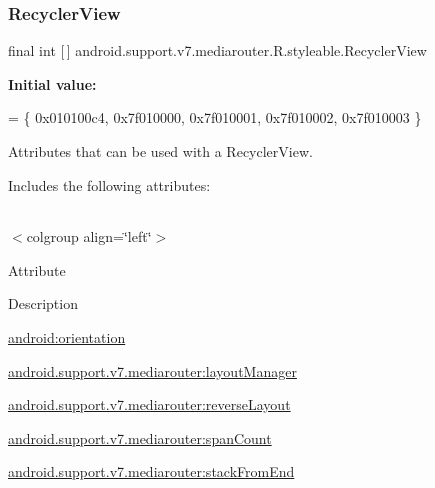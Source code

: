 \subsubsection{\texorpdfstring{Recycler\+View}{RecyclerView}}
{\footnotesize\ttfamily final int \mbox{[}$\,$\mbox{]} android.\+support.\+v7.\+mediarouter.\+R.\+styleable.\+Recycler\+View\hspace{0.3cm}{\ttfamily [static]}}

{\bfseries Initial value\+:}
\begin{DoxyCode}
= \{
            0x010100c4, 0x7f010000, 0x7f010001, 0x7f010002,
            0x7f010003
        \}
\end{DoxyCode}
Attributes that can be used with a Recycler\+View. 

Includes the following attributes\+:

\tabulinesep=1mm
\begin{longtabu} spread 0pt [c]{*{0}{|X[-1]}|}
\hline
\end{longtabu}
$<$colgroup align=\char`\"{}left\char`\"{}$>$ 

Attribute

Description 

{\ttfamily \hyperlink{classandroid_1_1support_1_1v7_1_1mediarouter_1_1R_1_1styleable_a621eb3784913669ba2918e93cd4458f3}{android\+:orientation}}

{\ttfamily \hyperlink{classandroid_1_1support_1_1v7_1_1mediarouter_1_1R_1_1styleable_aade41b174f9f40b820e6afdd3f51413c}{android.\+support.\+v7.\+mediarouter\+:layout\+Manager}}

{\ttfamily \hyperlink{classandroid_1_1support_1_1v7_1_1mediarouter_1_1R_1_1styleable_a80fce516766d6c33a441eea5da180b7b}{android.\+support.\+v7.\+mediarouter\+:reverse\+Layout}}

{\ttfamily \hyperlink{classandroid_1_1support_1_1v7_1_1mediarouter_1_1R_1_1styleable_ac4cd1f480c58b2a594180fd85c5007ae}{android.\+support.\+v7.\+mediarouter\+:span\+Count}}

{\ttfamily \hyperlink{classandroid_1_1support_1_1v7_1_1mediarouter_1_1R_1_1styleable_a6cee8e7efa348fbf26340673590b5287}{android.\+support.\+v7.\+mediarouter\+:stack\+From\+End}}

